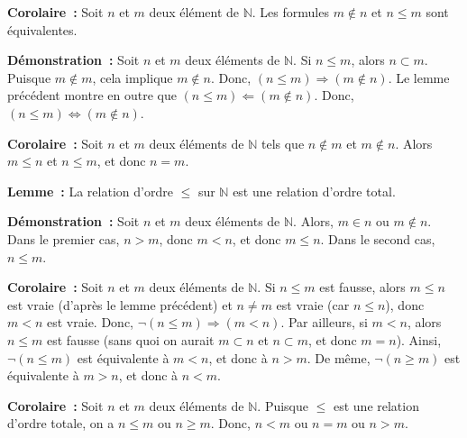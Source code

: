 \noindent\textbf{Corolaire :} 
    Soit $n$ et $m$ deux élément de $\mathbb{N}$. 
    Les formules $m \notin n$ et $n \leq m$ sont équivalentes.

\medskip

\noindent\textbf{Démonstration :} 
    Soit $n$ et $m$ deux éléments de $\mathbb{N}$. 
    Si $n \leq m$, alors $n \subset m$. 
    Puisque $m \notin m$, cela implique $m \notin n$. 
    Donc, $(n \leq m) \Rightarrow (m \notin n)$.
    Le lemme précédent montre en outre que $(n \leq m) \Leftarrow (m \notin n)$.
    Donc, $(n \leq m) \Leftrightarrow (m \notin n)$.
    
   \done 

\medskip

\noindent\textbf{Corolaire :} Soit $n$ et $m$ deux éléments de $\mathbb{N}$ tels que $n \notin m$ et $m \notin n$. 
    Alors $m \leq n$ et $n \leq m$, et donc $n = m$.

\medskip

\noindent\textbf{Lemme :} La relation d'ordre $\leq$ sur $\mathbb{N}$ est une relation d'ordre total.

\medskip

\noindent\textbf{Démonstration :} 
    Soit $n$ et $m$ deux éléments de $\mathbb{N}$. 
    Alors, $m \in n$ ou $m \notin n$. 
    Dans le premier cas, $n > m$, donc $m < n$, et donc $m \leq n$.
    Dans le second cas, $n \leq m$.

   \done 

\medskip

\noindent\textbf{Corolaire :} Soit $n$ et $m$ deux éléments de $\mathbb{N}$. 
    Si $n \leq m$ est fausse, alors $m \leq n$ est vraie (d'après le lemme précédent) et $n \neq m$ est vraie (car $n \leq n$), donc $m < n$ est vraie. 
    Donc, $\neg (n \leq m) \Rightarrow (m < n)$. 
    Par ailleurs, si $m < n$, alors $n \leq m$ est fausse (sans quoi on aurait $m \subset n$ et $n \subset m$, et donc $m = n$).
    Ainsi, $\neg (n \leq m)$ est équivalente à $m < n$, et donc à $n > m$.
    De même, $\neg (n \geq m)$ est équivalente à $m > n$, et donc à $n < m$.

\medskip

\noindent\textbf{Corolaire :} Soit $n$ et $m$ deux éléments de $\mathbb{N}$. 
    Puisque $\leq$ est une relation d'ordre totale, on a $n \leq m$ ou $n \geq m$. 
    Donc, $n < m$ ou $n = m$ ou $n > m$. 

\medskip


